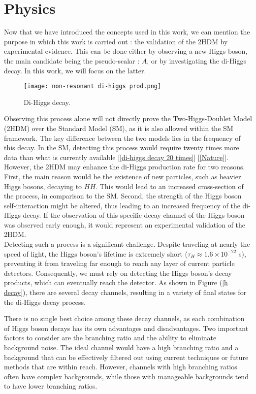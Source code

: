 \section{Physics}

Now that we have introduced the concepts used in this work, we can mention the purpose in which this work is carried out : the validation of the 2HDM by experimental evidence. This can be done either by observing a new Higgs boson, the main candidate being the pseudo-scalar : $A$, or by investigating the di-Higgs decay. In this work, we will focus on the latter. \\

\begin{figure}[H]
    \centering
    \texttt{[image: non-resonant di-higgs prod.png]}
    \caption{Di-Higgs decay.}
    \label{di-higgs decay}
\end{figure}
Observing this process alone will not directly prove the Two-Higgs-Doublet Model (2HDM) over the Standard Model (SM), as it is also allowed within the SM framework. The key difference between the two models lies in the frequency of this decay. In the SM, detecting this process would require twenty times more data than what is currently available [\ref{di-higgs decay 20 times}] [\ref{Nature}]. However, the 2HDM may enhance the di-Higgs production rate for two reasons. First, the main reason would be the existence of new particles, such as heavier Higgs bosons, decaying to $HH$. This would lead to an increased cross-section of the process, in comparison to the SM. Second, the strength of the Higgs boson self-interaction might be altered, thus leading to an increased frequency of the di-Higgs decay. If the observation of this specific decay channel of the Higgs boson was observed early enough, it would represent an experimental validation of the 2HDM.\\

Detecting such a process is a significant challenge. Despite traveling at nearly the speed of light, the Higgs boson's lifetime is extremely short ($\tau_H \approx 1.6 \times 10^{-22}$ s), preventing it from traveling far enough to reach any layer of current particle detectors. Consequently, we must rely on detecting the Higgs boson's decay products, which can eventually reach the detector. As shown in Figure (\ref{h decay}), there are several decay channels, resulting in a variety of final states for the di-Higgs decay process.

There is no single best choice among these decay channels, as each combination of Higgs boson decays has its own advantages and disadvantages. Two important factors to consider are the branching ratio and the ability to eliminate background noise. The ideal channel would have a high branching ratio and a background that can be effectively filtered out using current techniques or future methods that are within reach. However, channels with high branching ratios often have complex backgrounds, while those with manageable backgrounds tend to have lower branching ratios.

